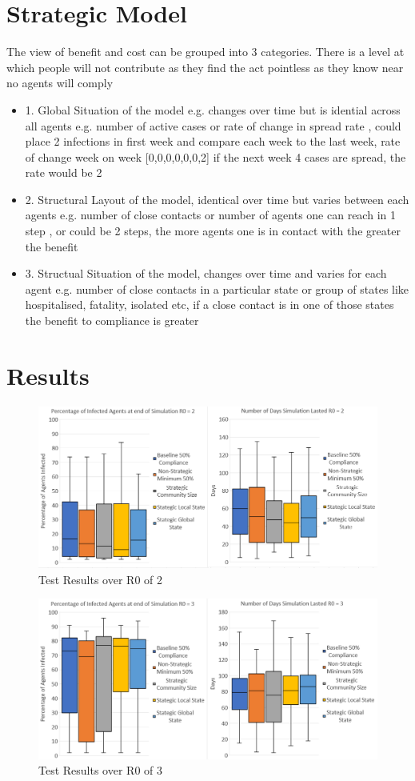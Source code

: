\documentclass{article}
\begin{document}
\section{Strategic Model}
The view of benefit and cost can be grouped into 3 categories.
There is a level at which people will not contribute as they find the act pointless as they know near no agents  will comply 
\begin{itemize}
\item1. Global Situation of the model e.g. changes over time but is idential across all agents
e.g. number of active cases or rate of change in spread rate , could place 2 infections in first week and compare each week to the last week, rate of change week on week
[0,0,0,0,0,0,2]  if the next week 4 cases are spread, the rate would be 2
\item2. Structural Layout of the model, identical over time but varies between each agents
e.g. number of close contacts or number of agents one can reach in 1 step , or could be 2 steps, the more agents one is in contact with the greater the benefit 
\item3. Structual Situation of the model, changes over time and varies for each agent
e.g. number of close contacts in a particular state or group of states like hospitalised, fatality, isolated etc, if a close contact is in one of those states the benefit to compliance is greater
\end{itemize}


\section{Results}


\begin{figure}[h!]
  \centering
      \includegraphics[width=\textwidth]{5}
  \caption{Test Results over R0 of 2}
\end{figure}

\newpage
\begin{figure}[h!]
  \centering
      \includegraphics[width=\textwidth]{4}
  \caption{Test Results over R0 of 3}
\end{figure}
\end{document}
